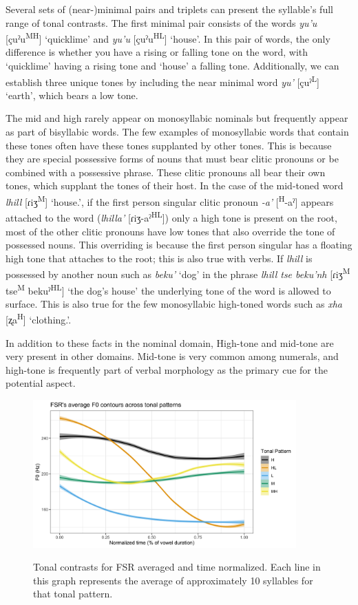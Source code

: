 \documentclass[12pt, letterpaper]{article}
\newcommand{\supr}[1]{\textsuperscript{#1}}
\begin{document}
Several sets of (near-)minimal pairs and triplets can present the syllable's full range of tonal contrasts. The first minimal pair consists of the words \textit{yu'u} [çuˀu\supr{MH}] `quicklime' and \textit{yu'u} [çuˀu\supr{HL}] `house'. In this pair of words, the only difference is whether you have a rising or falling tone on the word, with `quicklime' having a rising tone and `house' a falling tone. Additionally, we can establish three unique tones by including the near minimal word \textit{yu'} [çuˀ\supr{L}] `earth', which bears a low tone. 

The mid and high rarely appear on monosyllabic nominals but frequently appear as part of bisyllabic words. The few examples of monosyllabic words that contain these tones often have these tones supplanted by other tones. This is because they are special possessive forms of nouns that must bear clitic pronouns or be combined with a possessive phrase. These clitic pronouns all bear their own tones, which supplant the tones of their host. In the case of the mid-toned word \textit{lhill} [ɾiʒ\supr{M}] `house.\Poss{}{}', if the first person singular clitic pronoun \textit{-a'} [\supr{H}-aˀ] appears attached to the word (\textit{lhilla'} [ɾiʒ-aˀ\supr{HL}]) only a high tone is present on the root, most of the other clitic pronouns have low tones that also override the tone of possessed nouns. This overriding is because the first person singular has a floating high tone that attaches to the root; this is also true with verbs. If \textit{lhill} is possessed by another noun such as \textit{beku'} `dog' in the phrase \textit{lhill tse beku'nh} [ɾiʒ\supr{M} tse\supr{M} bekuˀ\supr{HL}] `the dog's house' the underlying tone of the word is allowed to surface. This is also true for the few monosyllabic high-toned words such as \textit{xha} [ʐa\supr{H}] `clothing.\Poss{}{}'.

In addition to these facts in the nominal domain, High-tone and mid-tone are very present in other domains. Mid-tone is very common among numerals, and high-tone is frequently part of verbal morphology as the primary cue for the potential aspect.

\begin{figure}[!ht]
	\centering
	\includegraphics[width=0.9\textwidth]{Images/FSRTonePlot.png}
	\label{fig:FSRTonePlot}
	\caption{Tonal contrasts for FSR averaged and time normalized. Each line in this graph represents the average of approximately 10 syllables for that tonal pattern. }
\end{figure}
\end{document}
